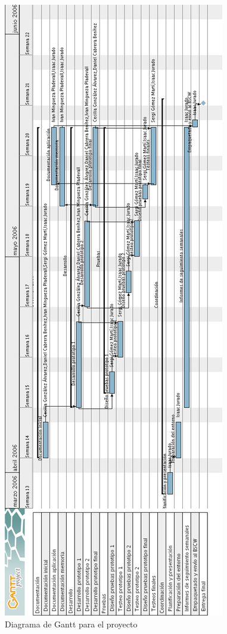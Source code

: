 \documentclass[a4paper,12pt,titlepage]{article}
\begin{document}
\begin{figure}
\begin{center}
\includegraphics[height=\textheight]{gantt2}
\caption{Diagrama de Gantt para el proyecto}\label{gantt}
\end{center}
\end{figure}
\end{document}
